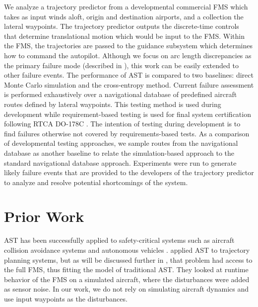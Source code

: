We analyze a trajectory predictor from a developmental commercial FMS which takes as input winds aloft, origin and destination airports, and a collection the lateral waypoints.
The trajectory predictor outputs the discrete-time controls that determine translational motion which would be input to the FMS.
Within the FMS, the trajectories are passed to the guidance subsystem which determines how to command the autopilot.
Although we focus on arc length discrepancies as the primary failure mode (described in ), this work can be easily extended to other failure events.
The performance of AST is compared to two baselines: direct Monte Carlo simulation and the cross-entropy method.
Current failure assessment is performed exhaustively over a navigational database of predefined aircraft routes defined by lateral waypoints.
This testing method is used during development while requirement-based testing is used for final system certification following RTCA DO-178C \cite{do178c}.
The intention of testing during development is to find failures otherwise not covered by requirements-based tests.
As a comparison of developmental testing approaches, we sample routes from the navigational database as another baseline to relate the simulation-based approach to the standard navigational database approach.
Experiments were run to generate likely failure events that are provided to the developers of the trajectory predictor to analyze and resolve potential shortcomings of the system.


\section{Prior Work} \label{sec:ast_prior_work}
AST has been successfully applied to safety-critical systems such as aircraft collision avoidance systems  \cite{lee2015adaptive,lee2018differential} and autonomous vehicles \cite{koren2018adaptive}. 
 applied AST to trajectory planning systems, but as will be discussed further in , that problem had access to the full FMS, thus fitting the model of traditional AST.
They looked at runtime behavior of the FMS on a simulated aircraft, where the disturbances were added as sensor noise.
In our work, we do not rely on simulating aircraft dynamics and use input waypoints as the disturbances.


